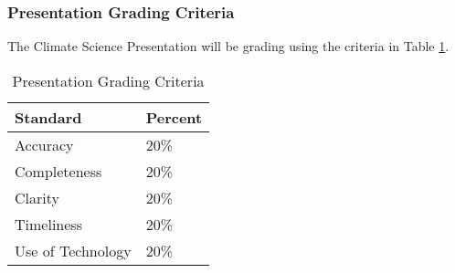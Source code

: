 \subsubsection{Presentation Grading Criteria}

The Climate Science Presentation will be grading using the criteria in Table \ref{tab:presentationgrading}.

\begin{table}[h]
\centering
\caption{Presentation Grading Criteria}
\label{tab:presentationgrading}
\begin{tabular}{ll}\hline
Standard            & Percent \\ \hline\hline    
Accuracy            & 20\%  \\
Completeness        & 20\% \\
Clarity             & 20\% \\
Timeliness          & 20\% \\
Use of Technology   & 20\% \\ \hline
\end{tabular}
\end{table}